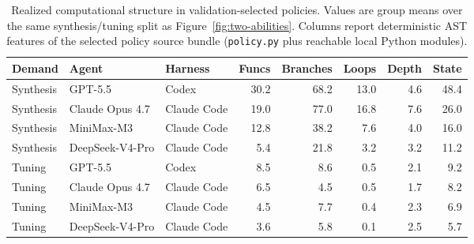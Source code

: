 \begin{table}[ht]
\caption{Realized computational structure in validation-selected policies.
Values are group means over the same synthesis/tuning split as
Figure~\ref{fig:two-abilities}. Columns report deterministic AST features of
the selected policy source bundle (\texttt{policy.py} plus reachable local
Python modules).}
\label{tab:code-structure}
\begin{center}
\footnotesize
\setlength{\tabcolsep}{3.5pt}
\begin{tabular}{@{}lllrrrrr@{}}
\toprule
Demand & Agent & Harness & Funcs & Branches & Loops & Depth & State \\
\midrule
Synthesis & GPT-5.5 & Codex & 30.2 & 68.2 & 13.0 & 4.6 & 48.4 \\
Synthesis & Claude Opus 4.7 & Claude Code & 19.0 & 77.0 & 16.8 & 7.6 & 26.0 \\
Synthesis & MiniMax-M3 & Claude Code & 12.8 & 38.2 & 7.6 & 4.0 & 16.0 \\
Synthesis & DeepSeek-V4-Pro & Claude Code & 5.4 & 21.8 & 3.2 & 3.2 & 11.2 \\
\midrule
Tuning & GPT-5.5 & Codex & 8.5 & 8.6 & 0.5 & 2.1 & 9.2 \\
Tuning & Claude Opus 4.7 & Claude Code & 6.5 & 4.5 & 0.5 & 1.7 & 8.2 \\
Tuning & MiniMax-M3 & Claude Code & 4.5 & 7.7 & 0.4 & 2.3 & 6.9 \\
Tuning & DeepSeek-V4-Pro & Claude Code & 3.6 & 5.8 & 0.1 & 2.5 & 5.7 \\
\bottomrule
\end{tabular}
\end{center}
\end{table}
